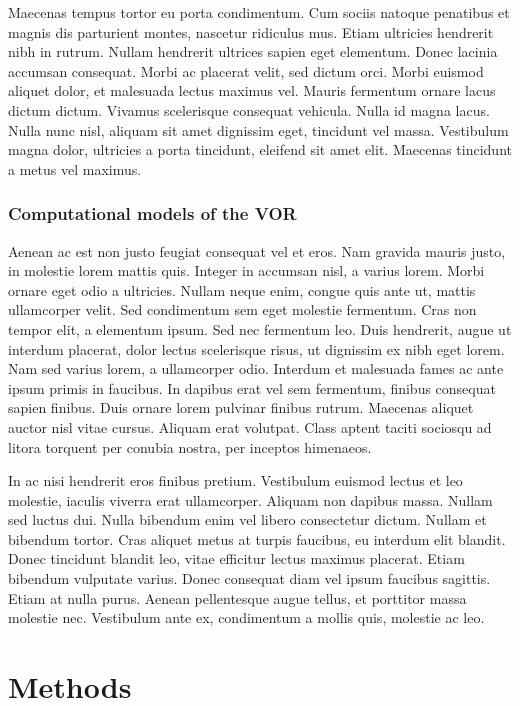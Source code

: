 \documentclass[12pt, a4paper,twoside]{tesi_upf}
\begin{document}
Maecenas tempus tortor eu porta condimentum. Cum sociis natoque penatibus et magnis dis parturient montes, nascetur ridiculus mus. Etiam ultricies hendrerit nibh in rutrum. Nullam hendrerit ultrices sapien eget elementum. Donec lacinia accumsan consequat. Morbi ac placerat velit, sed dictum orci. Morbi euismod aliquet dolor, et malesuada lectus maximus vel. Mauris fermentum ornare lacus dictum dictum. Vivamus scelerisque consequat vehicula. Nulla id magna lacus. Nulla nunc nisl, aliquam sit amet dignissim eget, tincidunt vel massa. Vestibulum magna dolor, ultricies a porta tincidunt, eleifend sit amet elit. Maecenas tincidunt a metus vel maximus.

\subsection{Computational models of the VOR}

Aenean ac est non justo feugiat consequat vel et eros. Nam gravida mauris justo, in molestie lorem mattis quis. Integer in accumsan nisl, a varius lorem. Morbi ornare eget odio a ultricies. Nullam neque enim, congue quis ante ut, mattis ullamcorper velit. Sed condimentum sem eget molestie fermentum. Cras non tempor elit, a elementum ipsum. Sed nec fermentum leo. Duis hendrerit, augue ut interdum placerat, dolor lectus scelerisque risus, ut dignissim ex nibh eget lorem. Nam sed varius lorem, a ullamcorper odio. Interdum et malesuada fames ac ante ipsum primis in faucibus. In dapibus erat vel sem fermentum, finibus consequat sapien finibus. Duis ornare lorem pulvinar finibus rutrum. Maecenas aliquet auctor nisl vitae cursus. Aliquam erat volutpat. Class aptent taciti sociosqu ad litora torquent per conubia nostra, per inceptos himenaeos.

In ac nisi hendrerit eros finibus pretium. Vestibulum euismod lectus et leo molestie, iaculis viverra erat ullamcorper. Aliquam non dapibus massa. Nullam sed luctus dui. Nulla bibendum enim vel libero consectetur dictum. Nullam et bibendum tortor. Cras aliquet metus at turpis faucibus, eu interdum elit blandit. Donec tincidunt blandit leo, vitae efficitur lectus maximus placerat. Etiam bibendum vulputate varius. Donec consequat diam vel ipsum faucibus sagittis. Etiam at nulla purus. Aenean pellentesque augue tellus, et porttitor massa molestie nec. Vestibulum ante ex, condimentum a mollis quis, molestie ac leo.



\chapter{Methods}
\end{document}
